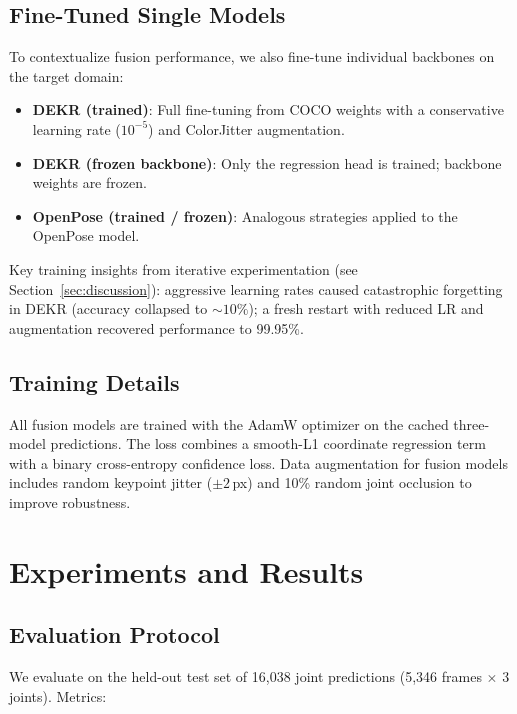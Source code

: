 \documentclass[11pt,a4paper]{article}
\begin{document}
\subsection{Fine-Tuned Single Models}\label{sec:finetuned}

To contextualize fusion performance, we also fine-tune individual backbones
on the target domain:

\begin{itemize}[nosep]
    \item \textbf{DEKR (trained)}: Full fine-tuning from COCO weights with a
        conservative learning rate ($10^{-5}$) and ColorJitter augmentation.
    \item \textbf{DEKR (frozen backbone)}: Only the regression head is
        trained; backbone weights are frozen.
    \item \textbf{OpenPose (trained / frozen)}: Analogous strategies applied
        to the OpenPose model.
\end{itemize}

Key training insights from iterative experimentation (see
Section~\ref{sec:discussion}): aggressive learning rates caused catastrophic
forgetting in DEKR (accuracy collapsed to ${\sim}10\%$); a fresh restart with
reduced LR and augmentation recovered performance to 99.95\%.

\subsection{Training Details}

All fusion models are trained with the AdamW optimizer on the cached
three-model predictions.  The loss combines a smooth-L1 coordinate regression
term with a binary cross-entropy confidence loss.  Data augmentation for fusion
models includes random keypoint jitter ($\pm 2$\,px) and 10\% random joint
occlusion to improve robustness.

\section{Experiments and Results}\label{sec:results}

\subsection{Evaluation Protocol}

We evaluate on the held-out test set of 16{,}038 joint predictions (5{,}346
frames $\times$ 3 joints).  Metrics:
\end{document}
